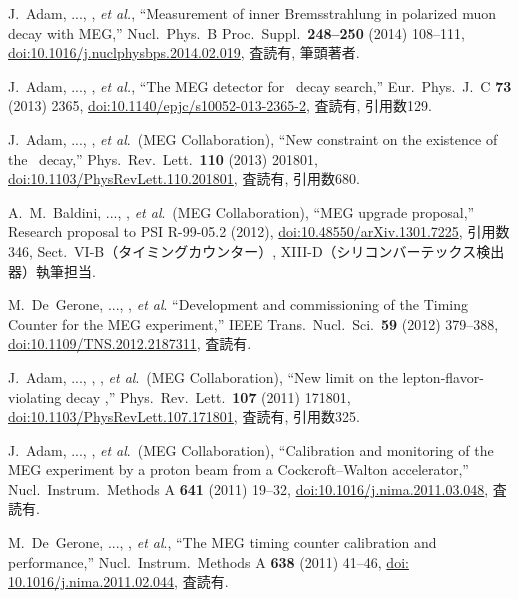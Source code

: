 \begin{enumerate}
  J.~Adam, ..., \me, {\it et al.},
  ``Measurement of inner Bremsstrahlung in polarized muon decay with MEG,''
  Nucl.\ Phys.\ B Proc.\ Suppl.\ \textbf{248--250} (2014) 108--111,
  \href{https://doi.org/10.1016/j.nuclphysbps.2014.02.019}{doi:10.1016/j.nuclphysbps.2014.02.019},
  査読有, 筆頭著者.

  J.~Adam, ..., \me,  {\it et al.},
  ``The MEG detector for \megc\ decay search,''
  Eur.\ Phys.\ J.\ C {\bf 73} (2013) 2365,
  \href{https://doi.org/10.1140/epjc/s10052-013-2365-2}{doi:10.1140/epjc/s10052-013-2365-2},
  査読有, 引用数129.

  J.~Adam, ..., \me,  {\it et al}.\ (MEG Collaboration),
  ``New constraint on the existence of the \megc\ decay,''
  Phys.\ Rev.\ Lett.\  {\bf 110} (2013) 201801,
  \href{https://doi.org/10.1103/PhysRevLett.110.201801}{doi:10.1103/PhysRevLett.110.201801},
  査読有, 引用数680.

 A.~M.~Baldini, ..., \me, {\it et al}.\ (MEG Collaboration),
 ``MEG upgrade proposal,'' Research proposal to PSI R-99-05.2 (2012),
 \href{https://doi.org/10.48550/arXiv.1301.7225}{doi:10.48550/arXiv.1301.7225},
 引用数346, Sect.\ VI-B（タイミングカウンター）, XIII-D（シリコンバーテックス検出器）執筆担当.

M.~De~Gerone, ..., \me, {\it et al}. %
``Development and commissioning of the Timing Counter for the MEG experiment,''
IEEE Trans.\ Nucl.\ Sci.\ \textbf{59} (2012) 379--388,
\href{http://dx.doi.org/10.1109/TNS.2012.2187311}{doi:10.1109/TNS.2012.2187311},
査読有.

J.~Adam, ..., \me, ,  {\it et al}.\ (MEG Collaboration),
``New limit on the lepton-flavor-violating decay \megc,''
Phys.\ Rev.\ Lett.\ \textbf{107} (2011) 171801,
\href{http://dx.doi.org/10.1103/PhysRevLett.107.171801}{doi:10.1103/PhysRevLett.107.171801},
査読有, 引用数325.

J.~Adam, ..., \me, {\it et al}.\ (MEG Collaboration),
``Calibration and monitoring of the MEG experiment by a proton beam from a Cockcroft--Walton accelerator,''
Nucl.\ Instrum.\ Methods A \textbf{641} (2011) 19--32,
\href{https://doi.org/10.1016/j.nima.2011.03.048}{doi:10.1016/j.nima.2011.03.048},
査読有.

M.~De~Gerone, ..., \me, {\it et al}., %
``The MEG timing counter calibration and performance,''
Nucl.\ Instrum.\ Methods A \textbf{638} (2011) 41--46,
\href{https://doi.org/10.1016/j.nima.2011.02.044}{doi: 10.1016/j.nima.2011.02.044},
査読有.


\end{enumerate}
